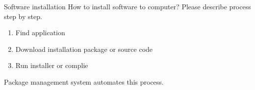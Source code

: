 \begin{frame}{Software installation}
 How to install software to computer? Please describe process step by step. 
\pause
    \begin{enumerate}
        \item Find application 
        \pause
        \item Download installation package or source code
        \pause
        \item Run installer or complie
    \end{enumerate}
    \alert{Package management system} automates this process.
\end{frame}
